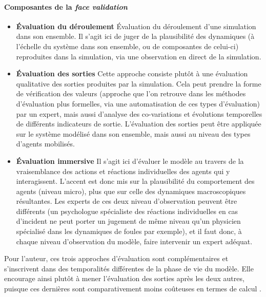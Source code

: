\paragraph{Composantes de la \textit{face validation}}\label{par:composantes-face-validation}
\begin{itemize}
	\item \textbf{Évaluation du déroulement} Évaluation du déroulement d'une simulation dans son ensemble.
	Il s'agit ici de juger de la plausibilité des dynamiques (à l'échelle du système dans son ensemble, ou de composantes de celui-ci) reproduites dans la simulation, via une observation en direct de la simulation.
	
	\item \textbf{Évaluation des sorties} Cette approche consiste plutôt à une évaluation qualitative des sorties produites par la simulation.
	Cela peut prendre la forme de vérification des valeurs (approche que l'on retrouve dans les méthodes d'évaluation plus formelles, via une automatisation de ces types d'évaluation) par un expert, mais aussi d'analyse des co-variations et évolutions temporelles de différents indicateurs de sortie.
	L'évaluation des sorties peut être appliquée sur le système modélisé dans son ensemble, mais aussi au niveau des types d'agents mobilisés.
	
	\item \textbf{Évaluation \og immersive\fg{}} Il s'agit ici d'évaluer le modèle au travers de la vraisemblance des actions et réactions individuelles des agents qui y interagissent. L'accent est donc mis sur la plausibilité du comportement des agents (niveau micro), plus que sur celle des dynamiques macroscopiques résultantes.
	Les experts de ces deux niveau d'observation peuvent être différents (un psychologue spécialiste des réactions individuelles en cas d'incident ne peut porter un jugement de même niveau qu'un physicien spécialisé dans les dynamiques de foules par exemple), et il faut donc, à chaque niveau d'observation du modèle, faire intervenir un expert adéquat.
\end{itemize}


Pour l'auteur, ces trois approches d'évaluation sont complémentaires et s'inscrivent dans des temporalités différentes de la phase de vie du modèle. Elle encourage ainsi plutôt à mener l'évaluation des sorties après les deux autres, puisque ces dernières sont comparativement moins coûteuses en termes de calcul \autocite[42]{klugl_validation_2008}.

